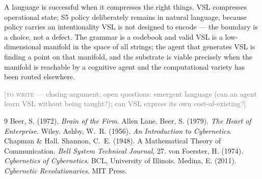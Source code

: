 \documentclass[12pt]{article}
\newcommand{\TODO}[1]{\medskip\noindent\textcolor{gray}{\small[\textsc{to write} --- #1]}\medskip}
\begin{document}
A language is successful when it compresses the right things. VSL compresses operational
state; S5 policy deliberately remains in natural language, because policy carries an
intentionality VSL is not designed to encode --- the boundary is a choice, not a defect.
The grammar is a codebook and valid VSL is a low-dimensional manifold in the space of all
strings; the agent that generates VSL is finding a point on that manifold, and the
substrate is viable precisely when the manifold is reachable by a cognitive agent and the
computational variety has been routed elsewhere.

\TODO{closing argument; open questions: emergent language (can an agent learn VSL without
being taught?); can VSL express its own cost-of-existing?}

\begin{thebibliography}{9}
 Beer, S. (1972). \textit{Brain of the Firm}. Allen Lane.
 Beer, S. (1979). \textit{The Heart of Enterprise}. Wiley.
 Ashby, W.~R. (1956). \textit{An Introduction to Cybernetics}. Chapman \& Hall.
 Shannon, C.~E. (1948). A Mathematical Theory of Communication.
  \textit{Bell System Technical Journal}, 27.
 von Foerster, H. (1974). \textit{Cybernetics of Cybernetics}.
  BCL, University of Illinois.
 Medina, E. (2011). \textit{Cybernetic Revolutionaries}. MIT Press.
\end{thebibliography}
\end{document}
